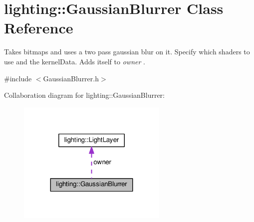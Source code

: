 \hypertarget{classlighting_1_1GaussianBlurrer}{}\section{lighting\+:\+:Gaussian\+Blurrer Class Reference}
\label{classlighting_1_1GaussianBlurrer}


Takes bitmaps and uses a two pass gaussian blur on it. Specify which shaders to use and the kernel\+Data. Adds itself to {\itshape owner} .  




{\ttfamily \#include $<$Gaussian\+Blurrer.\+h$>$}



Collaboration diagram for lighting\+:\+:Gaussian\+Blurrer\+:\nopagebreak
\begin{figure}[H]
\begin{center}
\leavevmode
\includegraphics[width=203pt]{classlighting_1_1GaussianBlurrer__coll__graph}
\end{center}
\end{figure}
